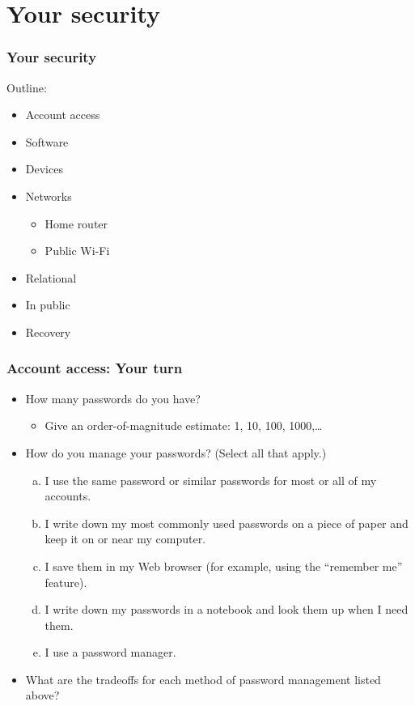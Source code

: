 \documentclass[blue]{beamer}
\begin{document}
\section{Your security}



\begin{frame}
\frametitle{Your security}

\begin{block}{Outline:}
\begin{itemize}
  \item Account access
  \item Software
  \item Devices
  \item Networks
  \begin{itemize}
    \item Home router
    \item Public Wi-Fi
  \end{itemize}
  \item Relational
  \item In public
  \item Recovery
\end{itemize}
\end{block}

\end{frame}



\begin{frame}
\frametitle{Account access: Your turn}

\begin{itemize}
  \item How many passwords do you have?
  \begin{itemize}
    \item Give an order-of-magnitude estimate: 1, 10, 100, 1000,\ldots{}
  \end{itemize}
  \item How do you manage your passwords? (Select all that apply.)
  \begin{enumerate}[(a)]
    \item I use the same password or similar passwords for most or all of my accounts.
    \item I write down my most commonly used passwords on a piece of paper and keep it on or near my computer.
    \item I save them in my Web browser (for example, using the ``remember me'' feature).
    \item I write down my passwords in a notebook and look them up when I need them.
    \item I use a password manager.
  \end{enumerate}
  \item What are the tradeoffs for each method of password management listed above?
\end{itemize}

\end{frame}
\end{document}

